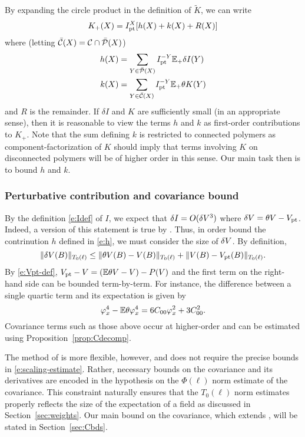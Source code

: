 By expanding the circle product in the definition of $\tilde K$, we can write
\begin{equation}
K_+(X) = I_{\rm pt}^X [h(X) + k(X) + R(X)]
\end{equation}
where (letting $\bar{\mathcal{C}}(X) = \mathcal{C}\cap\bar{\mathcal{P}}(X)$)
\begin{align}
\label{e:hpt}
h(X)	&= \sum_{Y\in\bar{\mathcal{P}}(X)} I_{\rm pt}^{-Y} \mathbb{E}_+ \delta I(Y) \\
\label{e:k}
k(X)	&= \sum_{Y\in\bar{\mathcal{C}}(X)} I_{\rm pt}^{-Y} \mathbb{E}_+ \theta K(Y)
\end{align}
and $R$ is the remainder. If $\delta I$ and $K$ are sufficiently small (in an
appropriate sense), then it is reasonable to view the terms $h$ and $k$ as
first-order contributions to $K_+$. Note that the sum defining $k$ is restricted
to connected polymers as component-factorization of $K$ should imply that terms
involving $K$ on disconnected polymers will be of higher order in this sense.
Our main task then is to bound $h$ and $k$.

\subsubsection{Perturbative contribution and covariance bound}

By the definition \eqref{e:Idef} of $I$, we expect that $\delta I = O(\delta V^3)$
where $\delta V = \theta V - V_{\rm pt}$. Indeed, a version of this statement is true
by \cite[Proposition~\ref{IE-prop:ip}]{BS-rg-IE}.
Thus, in order bound the contrinution $h$ defined in \eqref{e:h}, we must consider
the size of $\delta V$. By definition,
\begin{equation}
\|\delta V(B)\|_{T_0(\ell)}
	\le
\|\theta V(B) - V(B)\|_{T_0(\ell)} + \|V(B) - V_{\rm pt}(B)\|_{T_0(\ell)}.
\end{equation}
By \eqref{e:Vpt-def}, $V_{\rm pt} - V = (\mathbb{E} \theta V - V) - P(V)$ and
the first term on the right-hand side can be bounded term-by-term. For
instance, the difference between a single quartic term and its expectation
is given by
\begin{equation}
\varphi_x^4 - \mathbb{E} \theta\varphi_x^4
	=
6 C_{00} \varphi_x^2 + 3 C_{00}^2.
\end{equation}
Covariance terms such as those above occur at higher-order and can be
estimated using Proposition~\ref{prop:Cdecomp}.

The method of \cite{BS-rg-IE} is more flexible, however, and does not require
the precise bounds in \eqref{e:scaling-estimate}. Rather, necessary bounds on
the covariance and its derivatives are encoded in the hypothesis
\cite[\eqref{IE-e:CLbd}]{BS-rg-IE} on the $\Phi(\ell)$
norm estimate of the covariance. This constraint naturally ensures that the $T_0(\ell)$
norm estimates properly reflects the size of the expectation of a field as discussed
in Section~\ref{sec:weights}.
Our main bound on the covariance, which extends \cite[\eqref{IE-e:CLbd}]{BS-rg-IE},
will be stated in Section~\ref{sec:Cbds}.

